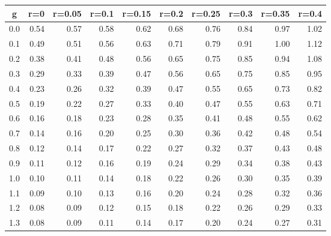 %
\begin{table}[!tbp]
 \begin{center}
 \begin{tabular}{rrrrrrrrrr}\hline\hline
\multicolumn{1}{c}{g}&\multicolumn{1}{c}{r=0}&\multicolumn{1}{c}{r=0.05}&\multicolumn{1}{c}{r=0.1}&\multicolumn{1}{c}{r=0.15}&\multicolumn{1}{c}{r=0.2}&\multicolumn{1}{c}{r=0.25}&\multicolumn{1}{c}{r=0.3}&\multicolumn{1}{c}{r=0.35}&\multicolumn{1}{c}{r=0.4}\tabularnewline
\hline
0.0&0.54&0.57&0.58&0.62&0.68&0.76&0.84&0.97&1.02\tabularnewline
0.1&0.49&0.51&0.56&0.63&0.71&0.79&0.91&1.00&1.12\tabularnewline
0.2&0.38&0.41&0.48&0.56&0.65&0.75&0.85&0.94&1.08\tabularnewline
0.3&0.29&0.33&0.39&0.47&0.56&0.65&0.75&0.85&0.95\tabularnewline
0.4&0.23&0.26&0.32&0.39&0.47&0.55&0.65&0.73&0.82\tabularnewline
0.5&0.19&0.22&0.27&0.33&0.40&0.47&0.55&0.63&0.71\tabularnewline
0.6&0.16&0.18&0.23&0.28&0.35&0.41&0.48&0.55&0.62\tabularnewline
0.7&0.14&0.16&0.20&0.25&0.30&0.36&0.42&0.48&0.54\tabularnewline
0.8&0.12&0.14&0.17&0.22&0.27&0.32&0.37&0.43&0.48\tabularnewline
0.9&0.11&0.12&0.16&0.19&0.24&0.29&0.34&0.38&0.43\tabularnewline
1.0&0.10&0.11&0.14&0.18&0.22&0.26&0.30&0.35&0.39\tabularnewline
1.1&0.09&0.10&0.13&0.16&0.20&0.24&0.28&0.32&0.36\tabularnewline
1.2&0.08&0.09&0.12&0.15&0.18&0.22&0.26&0.29&0.33\tabularnewline
1.3&0.08&0.09&0.11&0.14&0.17&0.20&0.24&0.27&0.31\tabularnewline
\hline
\end{tabular}

\end{center}

\end{table}

